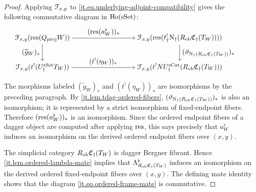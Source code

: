 \documentclass[a4paper,dvipdfmx,11pt]{amsart}
\begin{document}
\begin{proof}
  Applying $\mathcal{F}_{x,y}$ to \eqref{jt.eq.underlying-adjoint-compatibility} gives the following commutative diagram in $\mathrm{Ho}(\mathrm{sSet})$:
  \begin{align}
    &\begin{tikzpicture}[auto]
        \node (source) at (0,1.5) {$
          \calF_{x,y}(\res(Q_{\proj}W))$};
        \node (dagger-target) at (7,1.5) {$
          \calF_{x,y}
          (\res(t_{\dag}^{!}\N_{\dag}
          (R_{\rmob}\frakC_{\dag}(T_W))))$};
        \node (ordinary-source) at (0,0) {$
          \calF_{x,y}(t^!(\UdagSSet T_W))$};
        \node (ordinary-target) at (7,0) {$
          \calF_{x,y}
          (t^!N\UdagSCat
          (R_{\rmob}\frakC_{\dag}(T_W)))$};
        \draw[->]
          (source) --
          node[above] {$(\res(a_W^{\flat}))_*$}
          (dagger-target);
        \draw[->]
          (source) --
          node[left] {$(\widetilde g_W)_*$}
          (ordinary-source);
        \draw[->]
          (dagger-target) --
          node[right] {$
            (\vartheta_{\N_{\dag}(R_{\rmob}\frakC_{\dag}(T_W))})_*$}
          (ordinary-target);
        \draw[->]
          (ordinary-source) --
          node {$(t^!(\eta_W))_*$}
          (ordinary-target);
      \end{tikzpicture}
  \end{align}
  The morphisms labeled $(\widetilde g_W)_*$ and $(t^!(\eta_W))_*$ are isomorphisms by the preceding paragraph.
  By \cref{jt.lem.tdag-ordered-fibers}, $(\vartheta_{\mathrm{N}_{\dag}(R_{\mathrm{ob}}\mathfrak{C}_{\dag}(T_W))})_*$ is also an isomorphism;
  it is represented by a strict isomorphism of fixed-endpoint fibers.
  Therefore $(\mathrm{res}(a_W^{\flat}))_*$ is an isomorphism.
  Since the ordered endpoint fibers of a dagger object are computed after applying $\mathrm{res}$, this says precisely that $a_W^{\flat}$ induces an isomorphism on the derived ordered endpoint fibers over $(x,y)$.

  The simplicial category $R_{\mathrm{ob}}\mathfrak{C}_{\dag}(T_W)$ is dagger Bergner fibrant.
  Hence \cref{jt.lem.ordered-lambda-mate} implies that $\Lambda^{\flat}_{R_{\mathrm{ob}}\mathfrak{C}_{\dag}(T_W)}$ induces an isomorphism on the derived ordered fixed-endpoint fibers over $(x,y)$.
  The defining mate identity shows that the diagram \eqref{jt.eq.ordered-frame-mate} is commutative.
\end{proof}
\end{document}
